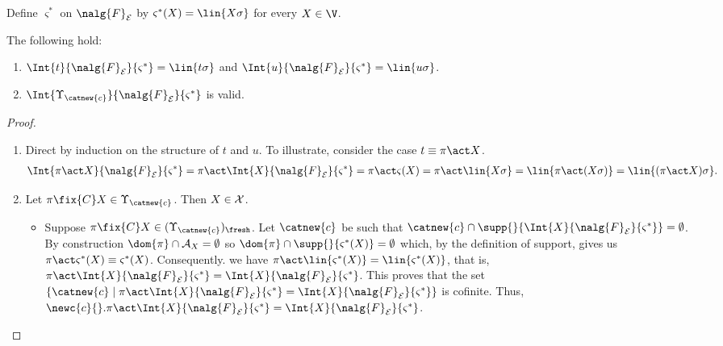 Define $\varsigma^*$ on $\nalg{F}_{\cal E}$ by $\varsigma^*(X) =\lin{X\sigma}$ for every $X\in\V$.

\begin{lemma}\label{alemma:interpretation}
The following hold:
\begin{enumerate}
\item \label{alemma:substitution-interpretation}
    $\Int{t}{\nalg{F}_{\cal E}}{\varsigma^*} = \lin{t\sigma}$ and $\Int{u}{\nalg{F}_{\cal E}}{\varsigma^*} = \lin{u\sigma}$.
\item \label{alemma:context-valid}
    $\Int{\Upsilon_{\catnew{c}}}{\nalg{F}_{\cal E}}{\varsigma^*}$ is valid.
\end{enumerate}
\end{lemma}


\begin{proof}
    \begin{enumerate}
        \item Direct by induction on the structure of $t$ and $u$. To illustrate, consider the case $t \equiv \pi\act X$.
        \begin{align*}
            \Int{\pi\act X}{\nalg{F}_{\cal E}}{\varsigma^*} = \pi\act \Int{X}{\nalg{F}_{\cal E}}{\varsigma^*} = \pi\act\varsigma(X) = \pi\act \lin{X\sigma} = \lin{\pi\act(X\sigma)} = \lin{(\pi\act X)\sigma}.
        \end{align*}

        \item Let $\pi\fix{C} X\in \Upsilon_{\catnew{c}}$. Then $X\in {\cal X}$.
    \begin{itemize}
        \item Suppose $\pi\fix{C} X\in (\Upsilon_{\catnew{c}})_{\fresh}$. Let $\catnew{c}$ be such that  $\catnew{c}\cap\supp{}{ \Int{X}{\nalg{F}_{\cal E}}{\varsigma^*}} = \emptyset$. By construction $\dom{\pi}\cap{\cal A}_X = \emptyset$   so $\dom{\pi}\cap \supp{}{\varsigma^*(X)} = \emptyset$ which, by the definition of support, gives us $\pi\act \varsigma^*(X) \equiv \varsigma^*(X)$. Consequently. we have $\pi\act \lin{\varsigma^*(X)} = \lin{\varsigma^*(X)}$, that is, $\pi\act \Int{X}{\nalg{F}_{\cal E}}{\varsigma^*} = \Int{X}{\nalg{F}_{\cal E}}{\varsigma^*}$. This proves that the set $\{\catnew{c} \mid  \pi\act \Int{X}{\nalg{F}_{\cal E}}{\varsigma^*} = \Int{X}{\nalg{F}_{\cal E}}{\varsigma^*}\}$ is cofinite. Thus, $\newc{c}{}.\pi\act \Int{X}{\nalg{F}_{\cal E}}{\varsigma^*} = \Int{X}{\nalg{F}_{\cal E}}{\varsigma^*}$.


\end{itemize}
\end{enumerate}
\end{proof}
